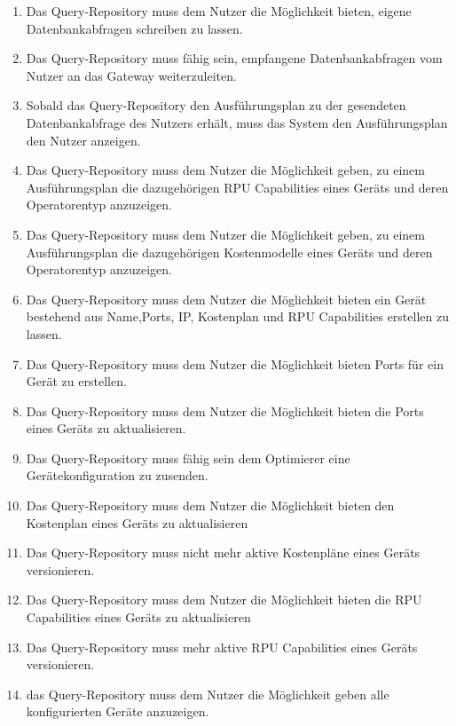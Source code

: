\begin{enumerate}
\item  Das Query-Repository muss dem Nutzer die Möglichkeit bieten, eigene Datenbankabfragen schreiben zu lassen.
\label{6}
\item  Das Query-Repository muss fähig sein, empfangene Datenbankabfragen vom Nutzer an das Gateway weiterzuleiten.
\label{7}
\item  Sobald das Query-Repository den Ausführungsplan zu der gesendeten Datenbankabfrage des Nutzers erhält, muss das System den Ausführungsplan den Nutzer anzeigen.	
\label{8}



\item  Das Query-Repository muss dem Nutzer die Möglichkeit geben, 
zu einem Ausführungsplan die dazugehörigen RPU Capabilities eines Geräts und deren Operatorentyp anzuzeigen.
\label{10}
\item  Das Query-Repository muss dem Nutzer die Möglichkeit geben, 
zu einem Ausführungsplan die dazugehörigen Kostenmodelle eines Geräts und deren Operatorentyp anzuzeigen.
\label{11}


\item  Das Query-Repository muss dem Nutzer die Möglichkeit bieten ein Gerät bestehend aus Name,Ports, IP, Kostenplan und RPU Capabilities erstellen zu lassen.
\label{12}
\item  Das Query-Repository muss dem Nutzer die Möglichkeit bieten  Ports für ein Gerät zu erstellen.
\label{13}
\item  Das Query-Repository muss dem Nutzer die Möglichkeit bieten die Ports eines Geräts zu aktualisieren.        
\label{14}
\item  Das Query-Repository muss fähig sein dem Optimierer eine Gerätekonfiguration zu zusenden.

\label{15}
\item  Das Query-Repository muss dem Nutzer die Möglichkeit bieten den Kostenplan eines Geräts zu aktualisieren
\label{16}
\item  Das Query-Repository muss nicht mehr aktive Kostenpläne eines Geräts 
versionieren.
\label{17}
\item  Das Query-Repository muss dem Nutzer die Möglichkeit bieten die RPU Capabilities eines Geräts zu aktualisieren
\label{18}
\item  Das Query-Repository muss mehr aktive RPU Capabilities eines Geräts versionieren.
\label{19}
\item  das Query-Repository muss dem Nutzer die Möglichkeit geben alle konfigurierten Geräte anzuzeigen.
\label{20}


\end{enumerate}
